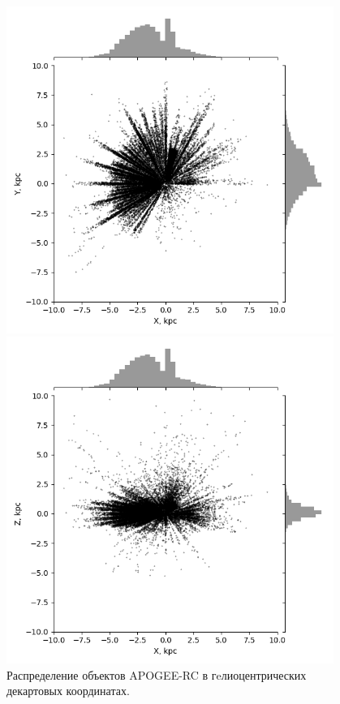 \documentclass{matmex-diploma-custom}
\begin{document}
\begin{figure}[h!]
\caption{Распределение объектов APOGEE-RC в гeлиоцентрических декартовых координатах.}
\begin{minipage}[h]{0.49\linewidth}
        \includegraphics[width=0.95\textwidth]{../imgs/XYobj.png}
\end{minipage}
\hfill
\begin{minipage}[h]{0.49\linewidth}
        \includegraphics[width=0.95\textwidth]{../imgs/XZobj.png}
\end{minipage}
\end{figure}
\end{document}

